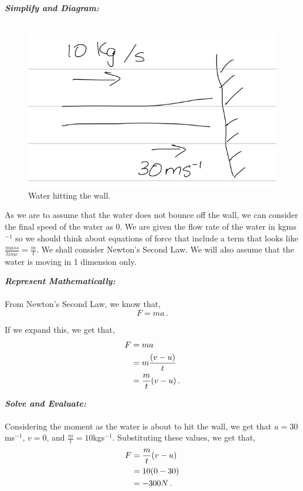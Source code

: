 \begin{subquestions}
	
	\textbf{\textit{Simplify and Diagram:}} \\ \\
	\begin{figure}[H]
		\begin{center}
			\includegraphics[scale=0.25]{../2015/figures/2015q6-1}
			\caption{\label{2015:q66:fig:Diagram1} Water hitting the wall.}
		\end{center}
	\end{figure}	
	As we are to assume that the water does not bounce off the wall, we can consider the final speed of the water as 0. We are given the flow rate of the water in kgms$^{-1}$ so we should think about equations of force that include a term that looks like $\frac{mass}{time}=\frac{m}{t}$. We shall consider Newton's Second Law. We will also assume that the water is moving in 1 dimension only.
	
	
	
	
	\textbf{\textit{Represent Mathematically:}} \\ \\
	From Newton's Second Law, we know that,
	\begin{equation}
		F=ma \,.
	\end{equation}
	
	If we expand this, we get that,
	\begin{align}
		F & = ma \nonumber \\
		& = m\frac{(v-u)}{t} \nonumber \\
		& = \frac{m}{t}(v-u) \,.
	\end{align}
	
	
	
	
	\textbf{\textit{Solve and Evaluate:}} \\ \\
	Considering the moment as the water is about to hit the wall, we get that $u=30$ms$^{-1}$, $v=0$, and $\frac{m}{t}=10$kgs$^{-1}$. Substituting these values, we get that,
	\begin{align}
		F & = \frac{m}{t}(v-u) \nonumber \\
		& = 10(0-30) \nonumber \\
		& = -300N \,.
	\end{align}	
	

\end{subquestions}
